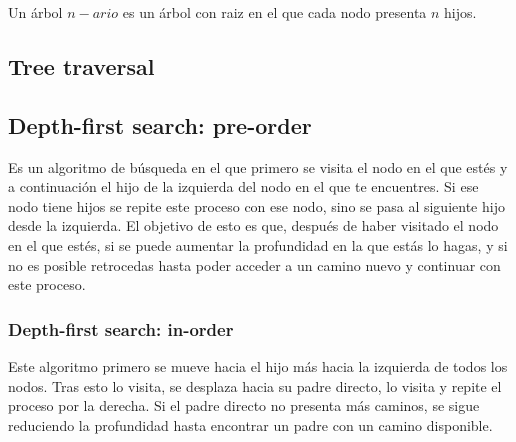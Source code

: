 \documentclass[11pt]{article}
\theoremstyle{plain}
\begin{document}
                Un árbol $n-ario$ es un árbol con raiz en el que cada nodo presenta $n$ hijos.
        \subsection{Tree traversal} %
        \label{sub:tree_traversal}
            \subsection{Depth-first search: pre-order} %
            \label{sub:depth_first_search_pre_order}
                Es un algoritmo de búsqueda en el que primero se visita el nodo en el que estés y a continuación el hijo de la izquierda del nodo en el que te encuentres. Si ese nodo tiene hijos se repite este proceso con ese nodo, sino se pasa al siguiente hijo desde la izquierda. El objetivo de esto es que, después de haber visitado el nodo en el que estés, si se puede aumentar la profundidad en la que estás lo hagas, y si no es posible retrocedas hasta poder acceder a un camino nuevo y continuar con este proceso.
            \subsubsection{Depth-first search: in-order} %
            \label{subsub:depth_first_search_in_order}
                Este algoritmo primero se mueve hacia el hijo más hacia la izquierda de todos los nodos. Tras esto lo visita, se desplaza hacia su padre directo, lo visita y repite el proceso por la derecha. Si el padre directo no presenta más caminos, se sigue reduciendo la profundidad hasta encontrar un padre con un camino disponible. 
\end{document}
